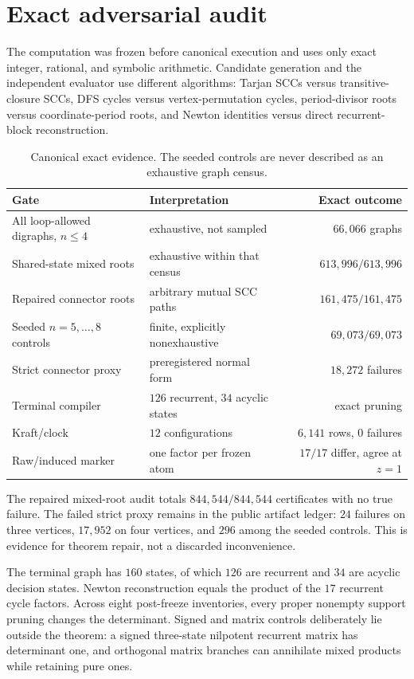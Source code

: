\section{Exact adversarial audit}

The computation was frozen before canonical execution and uses only exact
integer, rational, and symbolic arithmetic.  Candidate generation and the
independent evaluator use different algorithms: Tarjan SCCs versus
transitive-closure SCCs, DFS cycles versus vertex-permutation cycles,
period-divisor roots versus coordinate-period roots, and Newton identities
versus direct recurrent-block reconstruction.

\begin{table}[t]
\centering
\small
\begin{tabularx}{\textwidth}{@{}L{0.34\textwidth}Y r@{}}
\toprule
Gate & Interpretation & Exact outcome\\
\midrule
All loop-allowed digraphs, $n\le4$ & exhaustive, not sampled & $66{,}066$ graphs\\
Shared-state mixed roots & exhaustive within that census & $613{,}996/613{,}996$\\
Repaired connector roots & arbitrary mutual SCC paths & $161{,}475/161{,}475$\\
Seeded $n=5,\dots,8$ controls & finite, explicitly nonexhaustive & $69{,}073/69{,}073$\\
Strict connector proxy & preregistered normal form & $18{,}272$ failures\\
Terminal compiler & $126$ recurrent, $34$ acyclic states & exact pruning\\
Kraft/clock & $12$ configurations & $6{,}141$ rows, $0$ failures\\
Raw/induced marker & one factor per frozen atom & $17/17$ differ, agree at $z=1$\\
\bottomrule
\end{tabularx}
\caption{Canonical exact evidence.  The seeded controls are never described
as an exhaustive graph census.}
\label{tab:audit}
\end{table}

The repaired mixed-root audit totals $844{,}544/844{,}544$ certificates with
no true failure.  The failed strict proxy remains in the public artifact
ledger: $24$ failures on three vertices, $17{,}952$ on four vertices, and
$296$ among the seeded controls.  This is evidence for theorem repair, not a
discarded inconvenience.

The terminal graph has $160$ states, of which $126$ are recurrent and $34$
are acyclic decision states.  Newton reconstruction equals the product of
the $17$ recurrent cycle factors.  Across eight post-freeze inventories,
every proper nonempty support pruning changes the determinant.  Signed and
matrix controls deliberately lie outside the theorem: a signed three-state
nilpotent recurrent matrix has determinant one, and orthogonal matrix
branches can annihilate mixed products while retaining pure ones.

